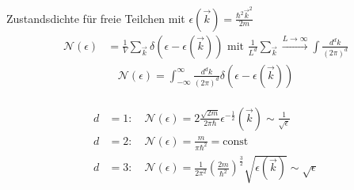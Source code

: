 




{\Huge
Zustandsdichte für freie Teilchen mit \(\epsilon(\vec k) = \frac{\hbar^2 \vec k^2}{2m}\)  
\begin{align*}
\mathcal N(\epsilon) &= \frac{1}{V} \sum_{\vec k} \delta(\epsilon - \epsilon(\vec k)) \text{ mit }\frac{1}{L^d}\sum_{\vec k} \xrightarrow{L\to \infty} \int \frac{d^d k}{(2\pi)^d}
\end{align*}
\begin{align*}
 \mathcal N(\epsilon) =  \int_{-\infty}^{\infty} \frac{d^d k}{(2\pi)^d} \delta(\epsilon - \epsilon(\vec k))  
\end{align*}

\begin{align*}
   \boxed{ \begin{aligned}
       d&=1: \quad \mathcal N(\epsilon) = 2\frac{\sqrt{2m}}{2\pi\hbar}  \epsilon^{-\frac{1}{2}}(\vec k) \sim \frac{1}{\sqrt{\epsilon}} \\
d&=2: \quad \mathcal N(\epsilon) = \frac{m}{\pi\hbar^2 } = \text{const} \\
d&=3: \quad \mathcal N(\epsilon) = \frac{1}{2\pi^2} \left(\frac{2m}{\hbar^2}\right)^{\frac{3}{2}} \sqrt{\epsilon(\vec k)}\sim \sqrt{\epsilon}
  \end{aligned}  }
\end{align*}
}%

